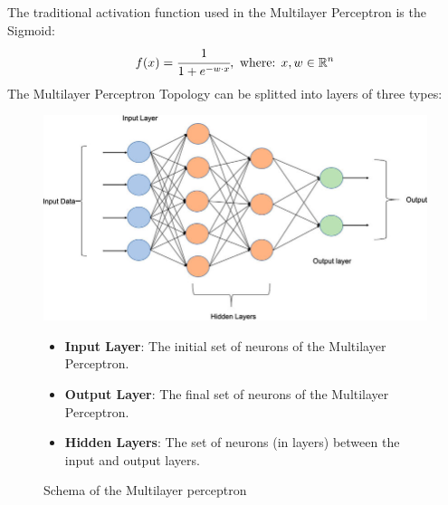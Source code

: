 \documentclass[a4paper, 11pt]{article}
\begin{document}
The traditional activation function used in the Multilayer Perceptron is the Sigmoid: 
\begin{equation*}
    f(x) = \cfrac{1}{1+e^{-w\cdot x}},\text{ where: } x,w\in\mathbb{R}^n
\end{equation*}
The Multilayer Perceptron Topology can be splitted into layers of three types:
\begin{figure}[h]
    \begin{minipage}{9cm}
        \includegraphics[width = 1 \textwidth]{Neural_Network/Multi-layer-perceptron-MLP-NN-basic-Architecture.png}
        \caption{Schema of the Multilayer perceptron}
    \end{minipage}
    \hspace{1em}
    \begin{minipage}{5cm}
        \begin{itemize}
            \item \textbf{Input Layer}: The initial set of neurons of the Multilayer Perceptron.
            \item \textbf{Output Layer}: The final set of neurons of the Multilayer Perceptron.
            \item \textbf{Hidden Layers}: The set of neurons (in layers) between the input and output layers.
        \end{itemize}
    \end{minipage}
\end{figure}\\
\newpage






\end{document}
